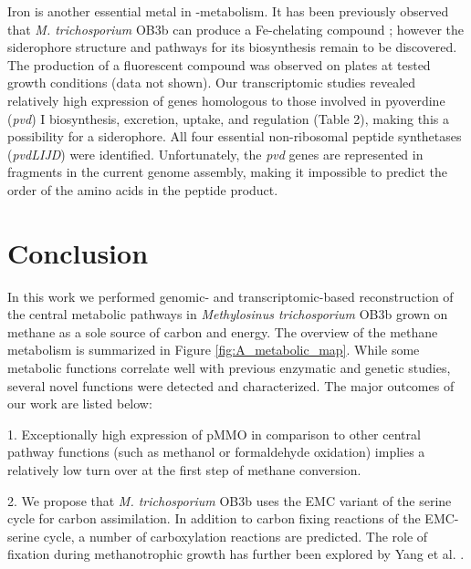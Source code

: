 Iron is another essential metal in -metabolism.
It has been previously observed that \textit{M. trichosporium} OB3b can produce a Fe-chelating compound \cite{yoon2010}; however the siderophore structure and pathways for its biosynthesis remain to be discovered.
The production of a fluorescent compound was observed on plates at tested growth conditions (data not shown).
Our transcriptomic studies revealed relatively high expression of genes homologous to those involved in pyoverdine (\textit{pvd}) I biosynthesis, excretion, uptake, and regulation (Table 2), making this a possibility for a siderophore.
All four essential non-ribosomal peptide synthetases (\textit{pvdLIJD}) were identified.
Unfortunately, the \textit{pvd} genes are represented in fragments in the current genome assembly, making it impossible to predict the order of the amino acids in the peptide product.

\section{Conclusion}

In this work we performed genomic- and transcriptomic-based reconstruction of the central metabolic pathways in \textit{Methylosinus trichosporium} OB3b grown on methane as a sole source of carbon and energy.
The overview of the methane metabolism is summarized in Figure \ref{fig:A_metabolic_map}.
While some metabolic functions correlate well with previous enzymatic and genetic studies, several novel functions were detected and characterized.
The major outcomes of our work are listed below:

1. Exceptionally high expression of pMMO in comparison to other central pathway functions (such as methanol or formaldehyde oxidation) implies a relatively low turn over at the first step of methane conversion.

2. We propose that \textit{M. trichosporium} OB3b uses the EMC variant of the serine cycle for carbon assimilation.
In addition to carbon fixing reactions of the EMC-serine cycle, a number of carboxylation reactions are predicted.
The role of  fixation during methanotrophic growth has further been explored by Yang et al. \cite{yangOB3b}.

